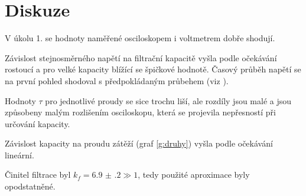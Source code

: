 \section*{Diskuze}
V úkolu 1. se hodnoty naměřené osciloskopem i voltmetrem dobře shodují.

Závislost stejnosměrného napětí na filtrační kapacitě vyšla podle očekávání rostoucí a pro velké kapacity blížící se špičkové hodnotě.
Časový průběh napětí se na první pohled shodoval s předpokládaným průbehem (viz \cite{skripta}).

Hodnoty $\tau$ pro jednotlivé proudy se sice trochu liší, ale rozdíly jsou malé a jsou způsobeny malým rozlišením osciloskopu, která se projevila nepřesností při určování kapacity.

Závislost kapacity na proudu zátěží (graf \ref{g:druhy}) vyšla podle očekávání lineární.

Činitel filtrace byl $k_f = \num{6.9(2)} \gg 1$, tedy použité aproximace byly opodstatněné.